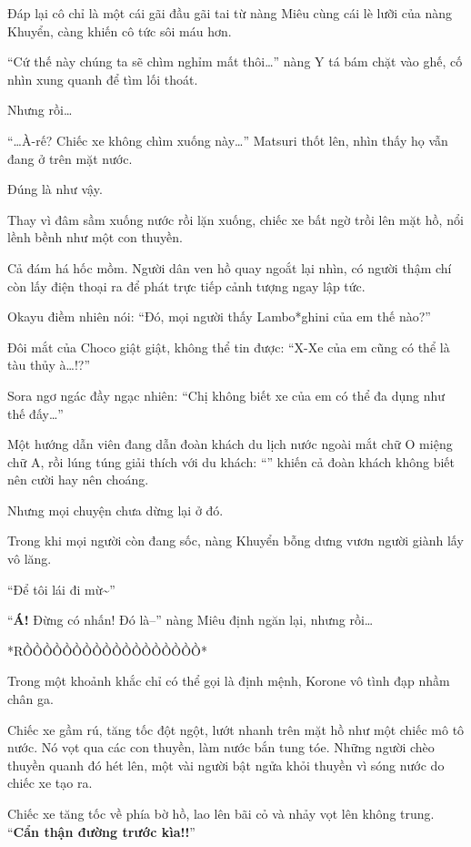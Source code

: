 \documentclass[../main.tex]{subfiles}
\begin{document}
Đáp lại cô chỉ là một cái gãi đầu gãi tai từ nàng Miêu cùng cái lè lưỡi của nàng Khuyển, càng khiến cô tức sôi máu hơn.

``Cứ thế này chúng ta sẽ chìm nghỉm mất thôi\dots'' nàng Y tá bám chặt vào ghế, cố nhìn xung quanh để tìm lối thoát.

Nhưng rồi\dots

``\dots À-rế? Chiếc xe không chìm xuống này\dots'' Matsuri thốt lên, nhìn thấy họ vẫn đang ở trên mặt nước.

Đúng là như vậy.

Thay vì đâm sầm xuống nước rồi lặn xuống, chiếc xe bất ngờ trồi lên mặt hồ, nổi lềnh bềnh như một con thuyền.

Cả đám há hốc mồm. Người dân ven hồ quay ngoắt lại nhìn, có người thậm chí còn lấy điện thoại ra để phát trực tiếp cảnh tượng ngay lập tức.

Okayu điềm nhiên nói: ``Đó, mọi người thấy Lambo*ghini của em thế nào?''

Đôi mắt của Choco giật giật, không thể tin được: ``X-Xe của em cũng có thể là tàu thủy à\dots!?''

Sora ngơ ngác đầy ngạc nhiên: ``Chị không biết xe của em có thể đa dụng như thế đấy\dots''

Một hướng dẫn viên đang dẫn đoàn khách du lịch nước ngoài mắt chữ O miệng chữ A, rồi lúng túng giải thích với du khách: ``'' khiến cả đoàn khách không biết nên cười hay nên choáng.

Nhưng mọi chuyện chưa dừng lại ở đó.

Trong khi mọi người còn đang sốc, nàng Khuyển bỗng dưng vươn người giành lấy vô lăng.

``Để tôi lái đi mừ\~{}''

``\textbf{Á!} Đừng có nhấn! Đó là--'' nàng Miêu định ngăn lại, nhưng rồi\dots

*RỒỒỒỒỒỒỒỒỒỒỒỒỒỒỒỒỒỒ*

Trong một khoảnh khắc chỉ có thể gọi là định mệnh, Korone vô tình đạp nhầm chân ga.

Chiếc xe gầm rú, tăng tốc đột ngột, lướt nhanh trên mặt hồ như một chiếc mô tô nước. Nó vọt qua các con thuyền, làm nước bắn tung tóe. Những người chèo thuyền quanh đó hét lên, một vài người bật ngửa khỏi thuyền vì sóng nước do chiếc xe tạo ra.

Chiếc xe tăng tốc về phía bờ hồ, lao lên bãi cỏ và nhảy vọt lên không trung. ``\textbf{Cẩn thận đường trước kìa!!}''
\end{document}
